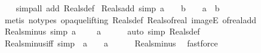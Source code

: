\begin{isabellebody}
%
\isadelimproof
\ \ %
\endisadelimproof
%
\isatagproof
{}\isamarkupfalse%
\ {\isacharparenleft}{\kern0pt}simp{\isacharunderscore}{\kern0pt}all\ add{\isacharcolon}{\kern0pt}\ Reals{\isacharunderscore}{\kern0pt}def{\isacharparenright}{\kern0pt}%
\endisatagproof
{\isafoldproof}%
%
\isadelimproof
\isanewline
%
\endisadelimproof
\isanewline
{}\isamarkupfalse%
\ Reals{\isacharunderscore}{\kern0pt}add\ {\isacharbrackleft}{\kern0pt}simp{\isacharbrackright}{\kern0pt}{\isacharcolon}{\kern0pt}\ {\isachardoublequoteopen}a\ {\isasymin}\ {\isasymreal}\ {\isasymLongrightarrow}\ b\ {\isasymin}\ {\isasymreal}\ {\isasymLongrightarrow}\ a\ {\isacharplus}{\kern0pt}\ b\ {\isasymin}\ {\isasymreal}{\isachardoublequoteclose}\isanewline
%
\isadelimproof
\ \ %
\endisadelimproof
%
\isatagproof
{}\isamarkupfalse%
\ {\isacharparenleft}{\kern0pt}metis\ {\isacharparenleft}{\kern0pt}no{\isacharunderscore}{\kern0pt}types{\isacharcomma}{\kern0pt}\ opaque{\isacharunderscore}{\kern0pt}lifting{\isacharparenright}{\kern0pt}\ Reals{\isacharunderscore}{\kern0pt}def\ Reals{\isacharunderscore}{\kern0pt}of{\isacharunderscore}{\kern0pt}real\ imageE\ of{\isacharunderscore}{\kern0pt}real{\isacharunderscore}{\kern0pt}add{\isacharparenright}{\kern0pt}%
\endisatagproof
{\isafoldproof}%
%
\isadelimproof
\isanewline
%
\endisadelimproof
\isanewline
{}\isamarkupfalse%
\ Reals{\isacharunderscore}{\kern0pt}minus\ {\isacharbrackleft}{\kern0pt}simp{\isacharbrackright}{\kern0pt}{\isacharcolon}{\kern0pt}\ {\isachardoublequoteopen}a\ {\isasymin}\ {\isasymreal}\ {\isasymLongrightarrow}\ {\isacharminus}{\kern0pt}\ a\ {\isasymin}\ {\isasymreal}{\isachardoublequoteclose}\isanewline
%
\isadelimproof
\ \ %
\endisadelimproof
%
\isatagproof
{}\isamarkupfalse%
\ {\isacharparenleft}{\kern0pt}auto\ simp{\isacharcolon}{\kern0pt}\ Reals{\isacharunderscore}{\kern0pt}def{\isacharparenright}{\kern0pt}%
\endisatagproof
{\isafoldproof}%
%
\isadelimproof
\isanewline
%
\endisadelimproof
\isanewline
{}\isamarkupfalse%
\ Reals{\isacharunderscore}{\kern0pt}minus{\isacharunderscore}{\kern0pt}iff\ {\isacharbrackleft}{\kern0pt}simp{\isacharbrackright}{\kern0pt}{\isacharcolon}{\kern0pt}\ {\isachardoublequoteopen}{\isacharminus}{\kern0pt}\ a\ {\isasymin}\ {\isasymreal}\ {\isasymlongleftrightarrow}\ a\ {\isasymin}\ {\isasymreal}{\isachardoublequoteclose}\isanewline
%
\isadelimproof
\ \ %
\endisadelimproof
%
\isatagproof
{}\isamarkupfalse%
\ Reals{\isacharunderscore}{\kern0pt}minus\ \isamarkupfalse%
\ fastforce%
\endisatagproof

\end{isabellebody}
